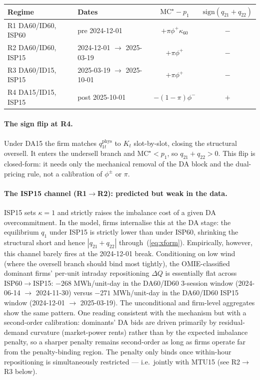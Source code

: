 \documentclass[11pt,a4paper]{article}
\begin{document}
\begin{center}
\begin{tabular}{llcc}
\toprule
Regime & Dates & $\mathrm{MC}^\star - p_1$ & $\mathrm{sign}(q_{21}+q_{22})$ \\
\midrule
R1 DA60/ID60, ISP60 & pre 2024-12-01      & $+\pi\phi^+\kappa_{60}$ & $-$ \\
R2 DA60/ID60, ISP15 & 2024-12-01 $\to$ 2025-03-19 & $+\pi\phi^+$ & $-$ \\
R3 DA60/ID15, ISP15 & 2025-03-19 $\to$ 2025-10-01 & $+\pi\phi^+$ & $-$ \\
R4 DA15/ID15, ISP15 & post 2025-10-01     & $-(1-\pi)\phi^-$        & $+$ \\
\bottomrule
\end{tabular}
\end{center}

\paragraph{The sign flip at R4.} Under DA15 the firm matches
$q_{1t}^{\mathrm{phys}}$ to $K_t$ slot-by-slot, closing the structural
oversell. It enters the undersell branch and
$\mathrm{MC}^\star < p_1$, so $q_{21}+q_{22}>0$. This flip is
closed-form: it needs only the mechanical removal of the DA block and
the dual-pricing rule, not a calibration of $\phi^\pm$ or $\pi$.

\paragraph{The ISP15 channel (R1$\to$R2): predicted but weak in the data.}
ISP15 sets $\kappa=1$ and strictly raises the imbalance cost of a given
DA overcommitment. In the model, firms internalise this at the DA stage:
the equilibrium $q_1$ under ISP15 is strictly lower than under ISP60,
shrinking the structural short and hence $|q_{21}+q_{22}|$
through~(\ref{eq:xform}). Empirically, however, this channel barely
fires at the 2024-12-01 break. Conditioning on low wind (where the
oversell branch should bind most tightly), the OMIE-classified dominant
firms' per-unit intraday repositioning $\Delta Q$ is essentially flat
across ISP60$\to$ISP15: $-268$ MWh/unit-day in the DA60/ID60 3-session
window (2024-06-14 $\to$ 2024-11-30) versus $-271$ MWh/unit-day in the
DA60/ID60 ISP15 window (2024-12-01 $\to$ 2025-03-19). The unconditional
and firm-level aggregates show the same pattern. One reading consistent
with the mechanism but with a second-order calibration: dominants' DA
bids are driven primarily by residual-demand curvature (market-power
rents) rather than by the expected imbalance penalty, so a sharper
penalty remains second-order as long as firms operate far from the
penalty-binding region. The penalty only binds once within-hour
repositioning is simultaneously restricted --- i.e.\ jointly with MTU15
(see R2$\to$R3 below).
\end{document}
